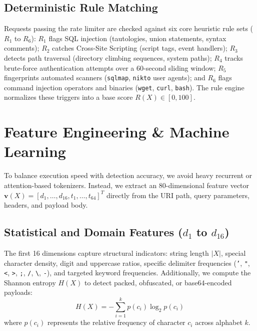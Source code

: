 \documentclass[conference]{IEEEtran}
\begin{document}
\subsection{Deterministic Rule Matching}
Requests passing the rate limiter are checked against six core heuristic rule sets ($R_1$ to $R_6$): $R_1$ flags SQL injection (tautologies, union statements, syntax comments); $R_2$ catches Cross-Site Scripting (script tags, event handlers); $R_3$ detects path traversal (directory climbing sequences, system paths); $R_4$ tracks brute-force authentication attempts over a 60-second sliding window; $R_5$ fingerprints automated scanners (\texttt{sqlmap}, \texttt{nikto} user agents); and $R_6$ flags command injection operators and binaries (\texttt{wget}, \texttt{curl}, \texttt{bash}). The rule engine normalizes these triggers into a base score $R(X) \in [0, 100]$.

\section{Feature Engineering \& Machine Learning}
To balance execution speed with detection accuracy, we avoid heavy recurrent or attention-based tokenizers. Instead, we extract an 80-dimensional feature vector $\mathbf{v}(X) = [d_1, \dots, d_{16}, t_1, \dots, t_{64}]^T$ directly from the URI path, query parameters, headers, and payload body.

\subsection{Statistical and Domain Features ($d_1$ to $d_{16}$)}
The first 16 dimensions capture structural indicators: string length $|X|$, special character density, digit and uppercase ratios, specific delimiter frequencies (\texttt{'}, \texttt{"}, \texttt{<}, \texttt{>}, \texttt{;}, \texttt{/}, \texttt{\textbackslash}, \texttt{-}), and targeted keyword frequencies. Additionally, we compute the Shannon entropy $H(X)$ to detect packed, obfuscated, or base64-encoded payloads:
\begin{equation}
H(X) = -\sum_{i=1}^{k} p(c_i) \log_2 p(c_i)
\end{equation}
where $p(c_i)$ represents the relative frequency of character $c_i$ across alphabet $k$.
\end{document}
